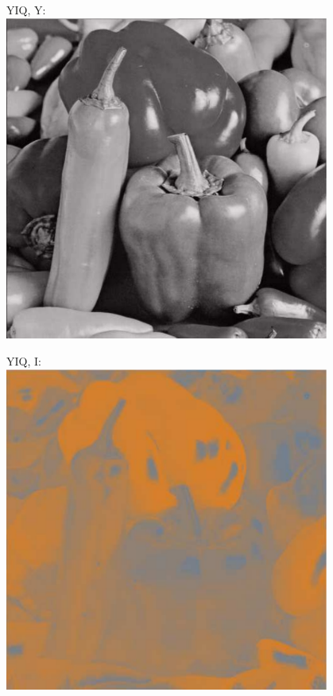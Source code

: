 \documentclass[a4paper,USenglish]{lipics}
\begin{document}
\begin{figure}
\medskip

\begin{minipage}[b]{0.33\textwidth}
YIQ, Y:\\
\includegraphics[width=0.95\textwidth]{images/yiqY}
\end{minipage}%
\begin{minipage}[b]{0.33\textwidth}
YIQ, I:\\
\includegraphics[width=0.95\textwidth]{images/yiqI2}

\end{minipage}
\end{figure}
\end{document}
